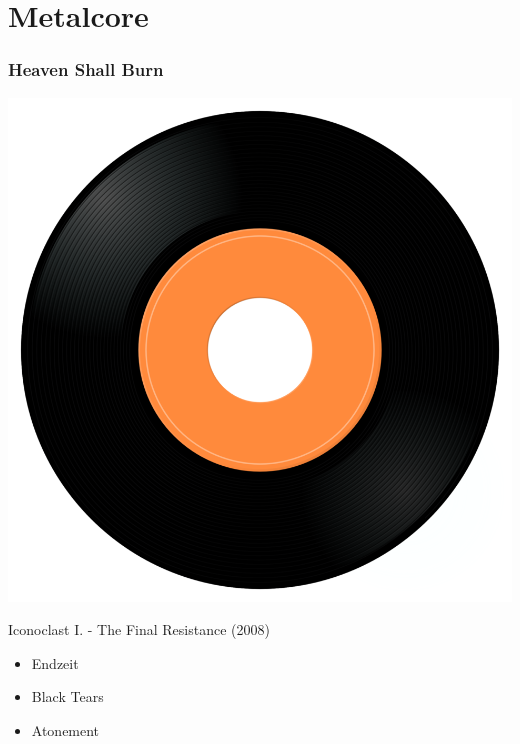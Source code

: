 \newpage

\section{Metalcore}


\subsubsection{Heaven Shall Burn}

\begin{minipage}[t]{0.25\textwidth}
\captionsetup{type=figure}
\includegraphics[width=\textwidth]{Images/cover.png}
\caption*{Iconoclast I. - The Final Resistance (2008)}
\end{minipage}
\begin{minipage}[t]{0.25\textwidth}\vspace{0pt}
\begin{itemize}[nosep,leftmargin=1em,labelwidth=*,align=left]
	\setlength{\itemsep}{0pt}
	\item Endzeit
	\item Black Tears
	\item Atonement
\end{itemize}
\end{minipage}
